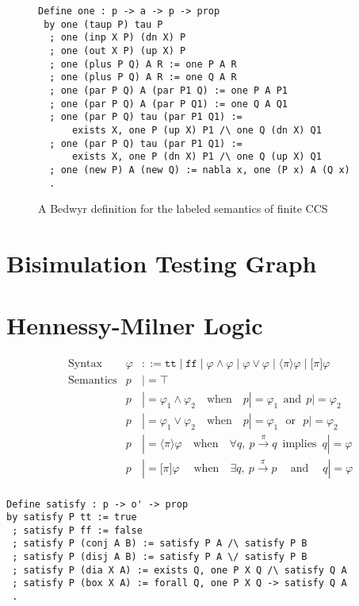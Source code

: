 \documentclass{llncs}
\begin{document}
\begin{figure}
\begin{verbatim}
Define one : p -> a -> p -> prop
 by one (taup P) tau P
  ; one (inp X P) (dn X) P
  ; one (out X P) (up X) P
  ; one (plus P Q) A R := one P A R
  ; one (plus P Q) A R := one Q A R
  ; one (par P Q) A (par P1 Q) := one P A P1
  ; one (par P Q) A (par P Q1) := one Q A Q1
  ; one (par P Q) tau (par P1 Q1) :=
      exists X, one P (up X) P1 /\ one Q (dn X) Q1
  ; one (par P Q) tau (par P1 Q1) :=
      exists X, one P (dn X) P1 /\ one Q (up X) Q1
  ; one (new P) A (new Q) := nabla x, one (P x) A (Q x)
  .
\end{verbatim}
\caption{A Bedwyr definition for the labeled semantics of finite CCS}
\label{fig:ccsone}
\end{figure}
\section{Bisimulation Testing Graph}


\section{Hennessy-Milner Logic}\label{sec:hml}
\begin{align*}
&\text{Syntax} &
\varphi & ::= \texttt{tt} \mid \texttt{ff}
    \mid \varphi \land \varphi \mid \varphi \lor \varphi
    \mid \langle\pi\rangle \varphi \mid \lbrack\pi\rbrack \varphi
\\
&\text{Semantics} &
  p & |= \top \\&&
  p & |= \varphi_1 \land \varphi_2 \quad\text{when}\quad p |= \varphi_1 ~~\text{and}~~ p |= \varphi_2 \\&&
  p & |= \varphi_1 \lor \varphi_2 \quad\text{when}\quad p |= \varphi_1 ~~~\text{or}~~~ p |= \varphi_2 \\&&
  p & |= \langle \pi \rangle \varphi \quad\text{when}\quad \forall q,~ p\xrightarrow{\pi} q ~\;\text{implies}~\; q |= \varphi \\&&
  p & |= \lbrack \pi \rbrack \varphi \;\quad\text{when}\quad \exists q,~ p\xrightarrow{\pi} p ~\quad\text{and}\quad\; q |= \varphi \\&&
\end{align*}

\begin{verbatim}
Define satisfy : p -> o' -> prop
by satisfy P tt := true
 ; satisfy P ff := false
 ; satisfy P (conj A B) := satisfy P A /\ satisfy P B
 ; satisfy P (disj A B) := satisfy P A \/ satisfy P B
 ; satisfy P (dia X A) := exists Q, one P X Q /\ satisfy Q A
 ; satisfy P (box X A) := forall Q, one P X Q -> satisfy Q A
 .
\end{verbatim}
\end{document}
